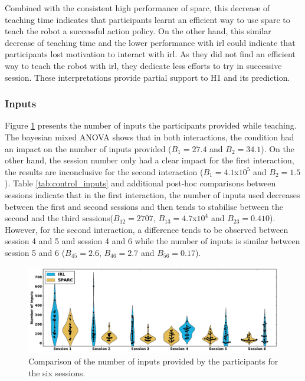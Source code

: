 Combined with the consistent high performance of \gls{sparc}, this decrease of teaching time indicates that participants learnt an efficient way to use \gls{sparc} to teach the robot a successful action policy. On the other hand, this similar decrease of teaching time and the lower performance with \gls{irl} could indicate that participants lost motivation to interact with \gls{irl}. As they did not find an efficient way to teach the robot with \gls{irl}, they dedicate less efforts to try in successive session. These interpretations provide partial support to H1 and its prediction.

\subsubsection{Inputs}
Figure \ref{fig:control_inputs} presents the number of inputs the participants provided while teaching. The bayesian mixed ANOVA shows that in both interactions, the condition had an impact on the number of inputs provided ($B_1=27.4$ and $B_2 = 34.1$). On the other hand,  the session number only had a clear impact for the first interaction, the results are inconclusive for the second interaction ($B_1=4.1$x$10^5$ and $B_2 = 1.5$). Table \ref{tab:control_inputs} and additional post-hoc comparisons between sessions indicate that in the first interaction, the number of inputs used decreases between the first and second sessions and then tends to stabilise between the second and the third sessions($B_{12}=2707$, $B_{13}=4.7$x$10^4$ and $B_{23}=0.410$). However, for the second interaction, a difference tends to be observed between session 4 and 5 and session 4 and 6 while the number of inputs is similar between session 5 and 6 ($B_{45}=2.6$, $B_{46}=2.7$ and $B_{56}=0.17$).

\begin{figure}[ht]
	\includegraphics[width=\textwidth]{inputs.pdf}
	\centering
	\caption{Comparison of the number of inputs provided by the participants for the six sessions. 
	}
	\label{fig:control_inputs}
\end{figure}

